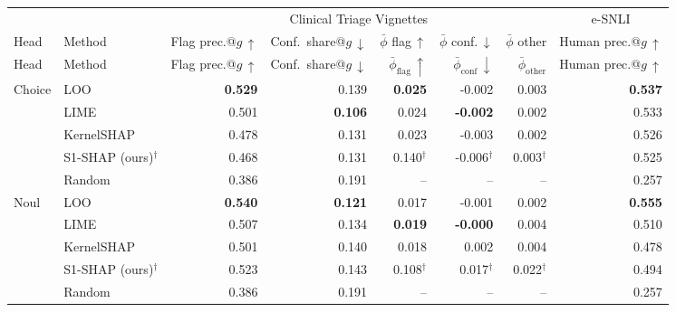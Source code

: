 \begin{tabular}{llrrrrrr}
\toprule
 & & \multicolumn{5}{c}{Clinical Triage Vignettes} & \multicolumn{1}{c}{e-SNLI} \\
\cmidrule(lr){3-7}\cmidrule(lr){8-8}
Head & Method & Flag prec.@$g\,\uparrow$ & Conf.\ share@$g\,\downarrow$ & $\bar{\phi}$ flag\,$\uparrow$ & $\bar{\phi}$ conf.\,$\downarrow$ & $\bar{\phi}$ other & Human prec.@$g\,\uparrow$ \\
Head & Method & Flag prec.@$g\,\uparrow$ & Conf.\ share@$g\,\downarrow$ & $\bar{\phi}_{\text{flag}}\,\uparrow$ & $\bar{\phi}_{\text{conf}}\,\downarrow$ & $\bar{\phi}_{\text{other}}$ & Human prec.@$g\,\uparrow$ \\
\midrule
Choice & LOO & \textbf{0.529} & 0.139 & \textbf{0.025} & -0.002 & 0.003 & \textbf{0.537} \\
 & LIME & 0.501 & \textbf{0.106} & 0.024 & \textbf{-0.002} & 0.002 & 0.533 \\
 & KernelSHAP & 0.478 & 0.131 & 0.023 & -0.003 & 0.002 & 0.526 \\
 & S1-SHAP (ours)$^\dagger$ & 0.468 & 0.131 & 0.140$^\dagger$ & -0.006$^\dagger$ & 0.003$^\dagger$ & 0.525 \\
 & Random & 0.386 & 0.191 & -- & -- & -- & 0.257 \\
\midrule
Noul & LOO & \textbf{0.540} & \textbf{0.121} & 0.017 & -0.001 & 0.002 & \textbf{0.555} \\
 & LIME & 0.507 & 0.134 & \textbf{0.019} & \textbf{-0.000} & 0.004 & 0.510 \\
 & KernelSHAP & 0.501 & 0.140 & 0.018 & 0.002 & 0.004 & 0.478 \\
 & S1-SHAP (ours)$^\dagger$ & 0.523 & 0.143 & 0.108$^\dagger$ & 0.017$^\dagger$ & 0.022$^\dagger$ & 0.494 \\
 & Random & 0.386 & 0.191 & -- & -- & -- & 0.257 \\
\bottomrule
\end{tabular}
